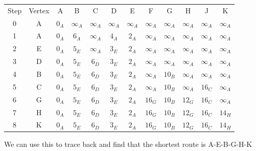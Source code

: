   \begin{table}[H]
  	\begin{tabular}{c c c c c c c c c c c c}
  		Step & Vertex & A & B & C & D & E & F & G & H & J & K \\ 
  		0 & A & $0_A$ & $\infty_A$ & $\infty_A$ & $\infty_A$ & $\infty_A$ & $\infty_A$ & $\infty_A$ & $\infty_A$ & $\infty_A$ & $\infty_A$  \\
  		1 & A & $0_A$ & $6_A$ & $\infty_A$ & $4_A$ & $2_A$ & $\infty_A$ & $\infty_A$ & $\infty_A$ & $\infty_A$ & $\infty_A$  \\
  		2 & E & $0_A$ & $5_E$ & $\infty_A$ & $3_E$ & $2_A$  & $\infty_A$ & $\infty_A$ & $\infty_A$ & $\infty_A$ & $\infty_A$  \\
  		3 & D & $0_A$ & $5_E$ & $6_D$ & $3_E$ & $2_A$  & $\infty_A$ & $\infty_A$ &  $\infty_A$ & $\infty_A$ & $\infty_A$ \\
  		4 & B & $0_A$ & $5_E$ & $6_D$ & $3_E$ & $2_A$  & $\infty_A$ & $10_B$ &  $\infty_A$ & $\infty_A$ & $\infty_A$ \\
  		5 & C & $0_A$ & $5_E$ & $6_D$ & $3_E$ & $2_A$  & $\infty_A$ & $10_B$ & $\infty_A$ & $16_C$ & $\infty_A$ \\
  		6 & G & $0_A$ & $5_E$ & $6_D$ & $3_E$ & $2_A$  & $16_G$ & $10_B$ & $12_G$ & $16_C$ & $\infty_A$ \\
  		7 & H & $0_A$ & $5_E$ & $6_D$ & $3_E$ & $2_A$  & $16_G$ & $10_B$ & $12_G$ & $16_C$ & $14_H$ \\
  		8 & K & $0_A$ & $5_E$ & $6_D$ & $3_E$ & $2_A$  & $16_G$ & $10_B$ & $12_G$ & $16_C$ & $14_H$ \\
  	\end{tabular}
  \end{table}
  
  We can use this to trace back and find that the shortest route is A-E-B-G-H-K
  
